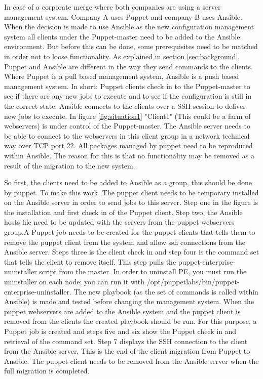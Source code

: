 In case of a corporate merge where both companies are using a server management system. Company A uses Puppet and company B uses Ansible. When the decision is made to use Ansible as the new configuration management system all clients under the Puppet-master need to be added to the Ansible environment. But before this can be done, some prerequisites need to be matched in order not to loose functionality.
As explained in section \ref{sec:background}, Puppet and Ansible are different in the way they send commands to the clients. Where Puppet is a pull based management system, Ansible is a push based management system. In short: Puppet clients check in to the Puppet-master to see if there are any new jobs to execute and to see if the configuration is still in the correct state. Ansible connects to the clients over a SSH session to deliver new jobs to execute. In figure \ref{fig:situation1} "Client1" (This could be a farm of webservers) is under control of the Puppet-master. The Ansible server needs to be able to connect to the webservers in this client group in a network technical way over TCP port 22. All packages managed by puppet need to be reproduced within Ansible. The reason for this is that no functionality may be removed as a result of the migration to the new system. 



So first, the clients need to be added to Ansible as a group, this should be done by puppet. To make this work. The puppet client needs to be temporary installed on the Ansible server in order to send jobs to this server. Step one in the figure is the installation and first check in of the Puppet client. Step two, the Ansible hosts file need to be updated with the servers from the puppet webservers group.A Puppet job needs to be created for the puppet clients that tells them to remove the puppet client from the system and allow ssh connections from the Ansible server. Steps three is the client check in and step four is the command set that tells the client to remove itself. This step pulls the puppet-enterprise-uninstaller script from the master. In order to uninstall PE, you must run the uninstaller on each node; you can run it with /opt/puppetlabs/bin/puppet-enterprise-uninstaller. The new playbook (as the set of commands is called within Ansible) is made and tested before changing the management system. When the puppet webservers are added to the Ansible system and the puppet client is removed from the clients the created playbook should be run. For this purpose, a Puppet job is created and steps five and six show the Puppet check in and retrieval of the command set. Step 7 displays the SSH connection to the client from the Ansible server. This is the end of the client migration from Puppet to Ansible. The puppet-client needs to be removed from the Ansible server when the full migration is completed.  

